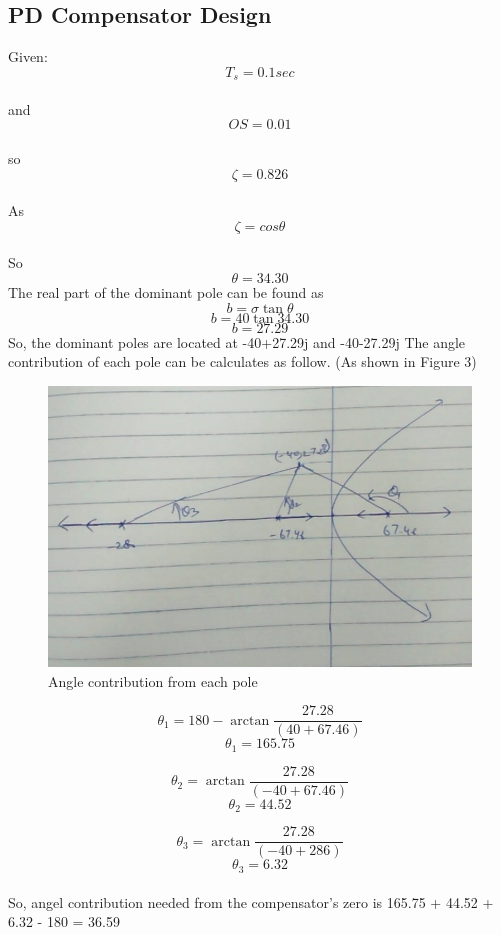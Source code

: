 \documentclass{article}
\begin{document}
\subsection{PD Compensator Design}
Given:
\\
\[ T_s = 0.1 sec \]
\\
and
\\
\[ OS = 0.01\]
\\
so  \[\zeta = 0.826 \] 
\\
As
\[ \zeta = cos{\theta} \] 
\\
So
\[ \theta = 34.30 \]
The real part of the dominant pole can be found as
\[ b = \sigma \tan{\theta} \]
\[ b = 40 \tan{34.30} \]
\[ b = 27.29 \]
So, the dominant poles are located at -40+27.29j and -40-27.29j
The angle contribution of each pole can be calculates as follow. (As shown in Figure 3)
\begin{figure}[h]
  \includegraphics[width=\linewidth]{dom_pole.jpg}
  \caption{Angle contribution from each pole}
  \label{fig:boat1}
\end{figure}
\[\theta_1 = 180 - \arctan{\frac{27.28}{(40+67.46)}} \]
\[\theta_1 = 165.75\]

\[\theta_2 = \arctan{\frac{27.28}{(-40+67.46)}} \]
\[\theta_2 = 44.52\]

\[\theta_3 = \arctan{\frac{27.28}{(-40+286)}} \]
\[\theta_3 = 6.32\]
\\
So, angel contribution needed from the compensator's zero is 165.75 + 44.52 + 6.32 - 180 = 36.59
\end{document}
